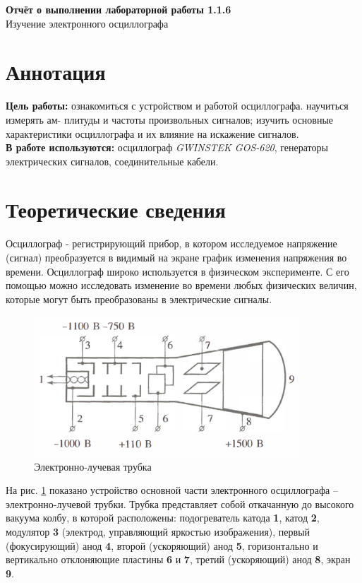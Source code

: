 \documentclass[a4paper,12pt]{article} %
\date{\today}
\begin{document}
	{\huge
		\begin{center}
			{\bf Отчёт о выполнении лабораторной работы 1.1.6}\\
			Изучение электронного осциллографа
		\end{center}
	}

	\section{Аннотация}
	
	\textbf{Цель работы:} ознакомиться с устройством и работой осциллографа. научиться измерять ам- плитуды и частоты произвольных сигналов; изучить основные характеристики осциллографа и их влияние на искажение сигналов.\\
	\textbf{В работе используются:} осциллограф \textit{GWINSTEK GOS-620}, генераторы электрических сигналов, соединительные кабели.
	
	\section{Теоретические сведения}
	
	Осциллограф - регистрирующий прибор, в котором исследуемое напряжение (сигнал) преобразуется в видимый на экране график изменения напряжения во времени. Осциллограф широко используется в физическом эксперименте. С его помощью можно исследовать изменение во времени любых физических величин, которые могут быть преобразованы в электрические сигналы.
	
	\begin{figure}
		\includegraphics[width=10cm]{truba.png}
		\caption{Электронно-лучевая трубка}
		\label{ELT}
	\end{figure}
	
	На рис. \ref{ELT} показано устройство основной части электронного осциллографа -- электронно-лучевой трубки. Трубка представляет собой откачанную до высокого вакуума колбу, в которой расположены: подогреватель катода \textbf{1}, катод \textbf{2}, модулятор \textbf{3} (электрод, управляющий яркостью изображения), первый (фокусирующий) анод \textbf{4}, второй (ускоряющий) анод \textbf{5}, горизонтально и вертикально отклоняющие пластины \textbf{6} и \textbf{7}, третий (ускоряющий) анод \textbf{8}, экран \textbf{9}. 
	
\end{document}
